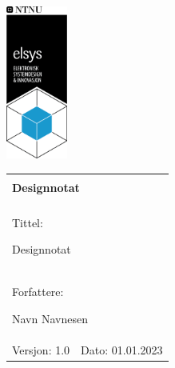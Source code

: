 \begin{minipage}[c]{0.15\textwidth}
\includegraphics[width=2.0cm]{Bilder/elsys_pos_staaende_ntnu.png}  
\end{minipage}
\begin{minipage}[c]{0.85\textwidth}

\renewcommand{\arraystretch}{1.7}
\large 
\begin{tabularx}{\textwidth}{|X|X|}
\hline
\multicolumn{2}{|l|}{} \\
\multicolumn{2}{|l|}{\huge \textbf{Designnotat}} \\
\multicolumn{2}{|l|}{}  \\
\hline
\multicolumn{2}{|l|}{Tittel: 

Designnotat
} \\
\hline
\multicolumn{2}{|l|}{Forfattere: 

Navn Navnesen
} \\
\hline

Versjon: 1.0 & Dato: 01.01.2023
\\
\hline 
\end{tabularx}
\end{minipage}
\normalsize